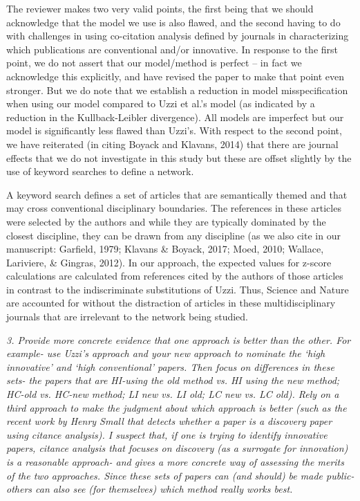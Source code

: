 \documentclass[11pt, oneside]{article}   	%
\begin{document}
The reviewer makes two very valid points, the first being that we should acknowledge that the model we use is also flawed, and the second having to do with challenges in using co-citation analysis defined by journals in characterizing which publications are conventional and/or innovative. In response to the first point, we do not assert that our model/method is perfect -- in fact we acknowledge this explicitly, and have revised the paper to make that point even stronger. But we do note that we establish a reduction in model misspecification when using our model compared to Uzzi et al.'s model (as indicated by a reduction in the Kullback-Leibler divergence). All models are imperfect but our model is significantly less flawed than Uzzi's. With respect to the second point, we have reiterated (in citing Boyack and Klavans, 2014) that there are journal effects that we do not investigate in this study but these are offset slightly by the use of keyword searches to define a network.

A keyword search defines a set of articles that are semantically themed and that may cross conventional disciplinary boundaries. The references in these articles were selected by the authors and while they are typically dominated by the closest discipline, they can be drawn from any discipline (as we also cite in our manuscript: Garfield, 1979; Klavans \& Boyack, 2017; Moed, 2010; Wallace, Lariviere, \& Gingras, 2012). In our approach, the expected values for z-score calculations are calculated from references cited by the authors of those articles in contrast to the indiscriminate substitutions of Uzzi. Thus, Science and Nature are accounted for without the distraction of articles in these multidisciplinary journals that are irrelevant to the network being studied.
 
\emph{3. Provide more concrete evidence that one approach is better than the other.  For example- use Uzzi's approach and your new approach to nominate the `high innovative' and `high conventional' papers.   Then focus on differences in these sets- the papers that are HI-using the old method vs. HI using the new method; HC-old vs. HC-new method; LI new vs. LI old; LC new vs. LC old).  Rely on a third approach to make the judgment about which approach is better (such as the recent work by Henry Small that detects whether a paper is a discovery paper using citance analysis). I suspect that, if one is trying to identify innovative papers, citance analysis that focuses on discovery (as a surrogate for innovation) is a reasonable approach- and gives a more concrete way of assessing the merits of the two approaches. Since these sets of papers can (and should) be made public- others can also see (for themselves) which method really works best.} 
\end{document}
